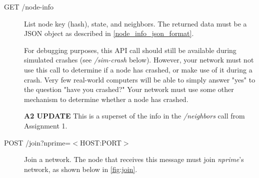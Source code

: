 \documentclass[]{article}
\begin{document}
\begin{description}


    \item[GET /node-info]

        List node key (hash), state, and neighbors.
        The returned data must be a JSON object as described in
        \autoref{node_info_json_format}.

        For debugging purposes, this API call should still be available during
        simulated crashes (see \textit{/sim-crash} below).
        However, your network must not use this call to determine if a node has
        crashed, or make use of it during a crash.
        Very few real-world computers will be able to simply answer "yes" to
        the question "have you crashed?"
        Your network must use some other mechanism to determine whether a node has crashed.


        \textbf{A2 UPDATE}
        This is a superset of the info in the
        \textit{/neighbors} call from Assignment 1.

    \item[POST /join?nprime=$<$HOST:PORT$>$]

        Join a network.
        The node that receives this message must join \textit{nprime}'s network, as shown below in \autoref{fig:join}.

        \begin{figure}[h!]

            \centering

\end{figure}
\end{description}
\end{document}
